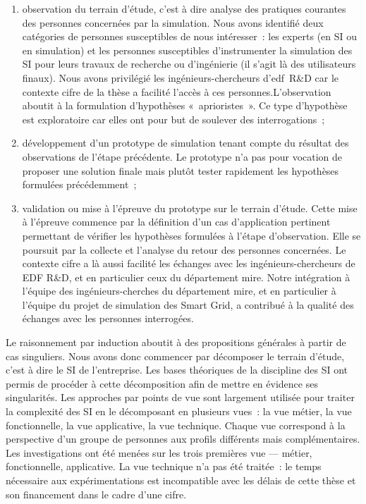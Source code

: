 		\begin{enumerate}
		
	\item observation du terrain d'étude, c'est à dire analyse des pratiques 
courantes des personnes concernées par la simulation. Nous avons identifié deux 
catégories de personnes susceptibles de nous intéresser~: les experts (en SI ou 
en simulation) et les personnes susceptibles d'instrumenter la simulation des SI 
pour leurs travaux de recherche ou d'ingénierie (il s'agit là des utilisateurs 
finaux). Nous avons privilégié les ingénieurs-chercheurs d'\gls{edf}~R\&D car le 
contexte \gls{cifre} de la thèse a facilité l'accès à ces 
personnes.L'observation aboutit à la formulation d'hypothèses «~aprioristes~». 
Ce type d'hypothèse est exploratoire car elles ont pour but de soulever des 
interrogations~;
	
	\item développement d'un prototype de simulation tenant compte du résultat des 
observations de l'étape précédente. Le prototype n'a pas pour vocation de 
proposer une solution finale mais plutôt tester rapidement les hypothèses 
formulées précédemment~;
	
	\item validation ou mise à l'épreuve du prototype sur le terrain d'étude. Cette 
mise à l'épreuve commence par la définition d'un cas d'application pertinent 
permettant de vérifier les hypothèses formulées à l'étape d'observation. Elle se 
poursuit par la collecte et l'analyse du retour des personnes concernées. Le 
contexte \gls{cifre} a là aussi facilité les échanges avec les 
ingénieurs-chercheurs de EDF R\&D, et en particulier ceux du département 
\gls{mire}. Notre intégration à l'équipe des ingénieurs-cherches du département 
\gls{mire}, et en particulier à l'équipe du projet de simulation des Smart Grid, 
a contribué à la qualité des échanges avec les personnes interrogées.
	
		\end{enumerate}
		
	Le raisonnement par induction aboutit à des propositions générales à partir de 
cas singuliers. Nous avons donc commencer par décomposer le terrain d'étude, 
c'est à dire le SI de l'entreprise. Les bases théoriques de la discipline des SI 
ont permis de procéder à cette décomposition afin de mettre en évidence ses 
singularités. Les approches par points de vue sont largement utilisée pour 
traiter la complexité des SI en le décomposant en plusieurs vues~: la vue 
métier, la vue fonctionnelle, la vue applicative, la vue technique. Chaque vue 
correspond à la perspective d'un groupe de personnes aux profils différents mais 
complémentaires. Les investigations ont été menées sur les trois premières vue — 
métier, fonctionnelle, applicative. La vue technique n'a pas été traitée~: le 
temps nécessaire aux expérimentations est incompatible avec les délais de cette 
thèse et son financement dans le cadre d'une \gls{cifre}.
	
